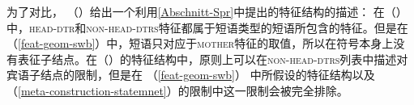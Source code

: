 \noindent
为了对比， （）给出一个利用\ref{Abschnitt-Spr}中提出的特征结构的描述：
\ea
{}
\z
在（）中，\textsc{head-dtr}和\textsc{non-head-dtrs}特征都属于短语类型的短语所包含的特征。但是在 （\ref{feat-geom-swb}）中，短语只对应于\textsc{mother}特征的取值，所以在符号本身上没有表征子结点。在（）的特征结构中，原则上可以在\textsc{non-head-dtrs}列表中描述对宾语子结点的限制，但是在 （\ref{feat-geom-swb}） 中所假设的特征结构以及（\ref{meta-construction-statemnet}）的限制中这一限制会被完全排除。

